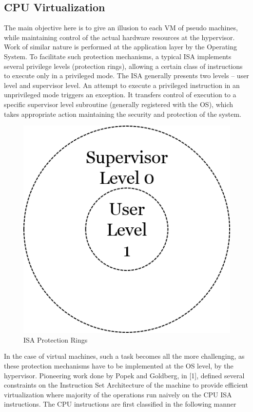 \subsection{CPU Virtualization}

The main objective here is to give an illusion to each VM of pseudo machines, while maintaining control of the actual hardware resources at the hypervisor. Work of similar nature is performed at the application layer by the Operating System. To facilitate such protection mechanisms, a typical ISA implements several privilege levels (protection rings), allowing a certain class of instructions to execute only in a privileged mode. The ISA generally presents two levels -- user level and supervisor level. An attempt to execute a privileged instruction in an unprivileged mode triggers an exception. It transfers control of execution to a specific supervisor level subroutine (generally registered with the OS), which takes appropriate action maintaining the security and protection of the system. 



\setlength{\belowcaptionskip}{-10pt}

\begin{figure}[H]
  \centering
  \includegraphics[scale=0.6]{figures/protect_levels.png}
  \caption{ISA Protection Rings}
  \label{fig:protect_2}
\end{figure}

In the case of virtual machines, such a task becomes all the more challenging, as these protection mechanisms have to be implemented at the OS level, by the hypervisor. Pioneering work done by Popek and Goldberg, in [1], defined several constraints on the Instruction Set Architecture of the machine to provide efficient virtualization where majority of the operations run naively on the CPU ISA instructions. The CPU instructions are first classified in the following manner 

